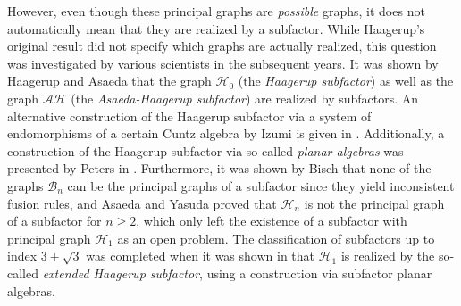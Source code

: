 {	However, even though these principal graphs are \emph{possible} graphs, it does not automatically mean that they are realized by a subfactor. While Haagerup's original result did not specify which graphs are actually realized, this question was investigated by various scientists in the subsequent years. It was shown by Haagerup and Asaeda \cite{asaeda_exotic_1999} that the graph $\mathcal{H}_0$ (the \emph{Haagerup subfactor}) as well as the graph $\mathcal{AH}$ (the \emph{Asaeda-Haagerup subfactor}) are realized by subfactors. An alternative construction of the Haagerup subfactor via a system of endomorphisms of a certain Cuntz algebra by Izumi is given in \cite{izumi_structure_2001}. Additionally, a construction of the Haagerup subfactor via so-called \emph{planar algebras} was presented by Peters in \cite{Peters2010}. Furthermore, it was shown by Bisch \cite{Bisch1998} that none of the graphs $\mathcal{B}_n$ can be the principal graphs of a subfactor since they yield inconsistent fusion rules, and Asaeda and Yasuda \cite{Asaeda2007,Asaeda2008} proved that $\mathcal{H}_n$ is not the principal graph of a subfactor for $n\ge 2$, which only left the existence of a subfactor with principal graph $\mathcal{H}_1$ as an open problem. The classification of subfactors up to index $3+\sqrt{3}$ was completed when it was shown in \cite{bigelow_constructing_2012} that $\mathcal{H}_1$ is realized by the so-called \emph{extended Haagerup subfactor}, using a construction via subfactor planar algebras.
	
}
